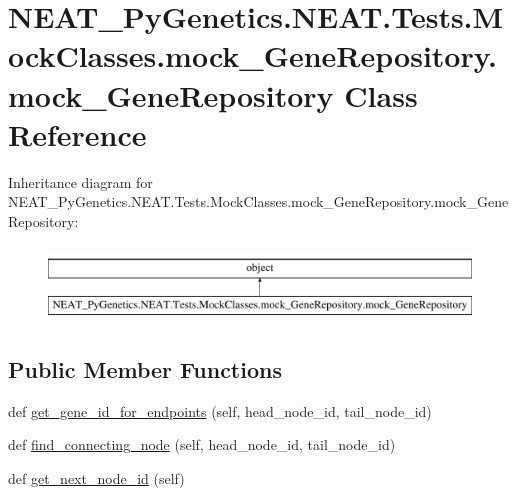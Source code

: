 \hypertarget{classNEAT__PyGenetics_1_1NEAT_1_1Tests_1_1MockClasses_1_1mock__GeneRepository_1_1mock__GeneRepository}{}\section{N\+E\+A\+T\+\_\+\+Py\+Genetics.\+N\+E\+A\+T.\+Tests.\+Mock\+Classes.\+mock\+\_\+\+Gene\+Repository.\+mock\+\_\+\+Gene\+Repository Class Reference}
\label{classNEAT__PyGenetics_1_1NEAT_1_1Tests_1_1MockClasses_1_1mock__GeneRepository_1_1mock__GeneRepository}
Inheritance diagram for N\+E\+A\+T\+\_\+\+Py\+Genetics.\+N\+E\+A\+T.\+Tests.\+Mock\+Classes.\+mock\+\_\+\+Gene\+Repository.\+mock\+\_\+\+Gene\+Repository\+:\begin{figure}[H]
\begin{center}
\leavevmode
\includegraphics[height=2.000000cm]{classNEAT__PyGenetics_1_1NEAT_1_1Tests_1_1MockClasses_1_1mock__GeneRepository_1_1mock__GeneRepository}
\end{center}
\end{figure}
\subsection*{Public Member Functions}
\begin{DoxyCompactItemize}
\item 
def \hyperlink{classNEAT__PyGenetics_1_1NEAT_1_1Tests_1_1MockClasses_1_1mock__GeneRepository_1_1mock__GeneRepository_a7b5eef06e8d2486c49acb86b74f43316}{get\+\_\+gene\+\_\+id\+\_\+for\+\_\+endpoints} (self, head\+\_\+node\+\_\+id, tail\+\_\+node\+\_\+id)
\item 
def \hyperlink{classNEAT__PyGenetics_1_1NEAT_1_1Tests_1_1MockClasses_1_1mock__GeneRepository_1_1mock__GeneRepository_af8237f68a2528e68c6984225bc9a116f}{find\+\_\+connecting\+\_\+node} (self, head\+\_\+node\+\_\+id, tail\+\_\+node\+\_\+id)
\item 
def \hyperlink{classNEAT__PyGenetics_1_1NEAT_1_1Tests_1_1MockClasses_1_1mock__GeneRepository_1_1mock__GeneRepository_a496072cac2263f4b7213ba45f4458883}{get\+\_\+next\+\_\+node\+\_\+id} (self)
\end{DoxyCompactItemize}


